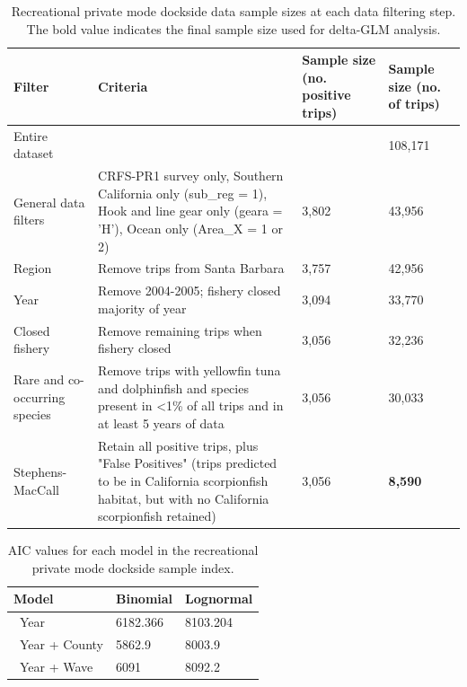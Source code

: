 \documentclass[12pt,]{article}
\begin{document}
\FloatBarrier

\begin{table}[ht]
\centering
\caption{Recreational private mode dockside data sample 
                                          sizes at each data filtering step.  
                                          The bold value indicates the final sample size 
                                          used for delta-GLM analysis.} 
\label{tab:Fleet4_RecPR_dockside_filter}
\begin{tabular}{>{\raggedright}p{1.5in}>{\raggedright}p{2.6in}>{\raggedright}p{1in}>{\raggedright}p{1in}}
  \hline
Filter & Criteria & Sample size (no. positive trips) & Sample size (no. of trips) \\ 
  \hline
Entire dataset &  &  & 108,171 \\ 
  General data filters & CRFS-PR1 survey only, Southern California only (sub\_reg = 1), Hook and line gear only (geara = 'H'), Ocean only (Area\_X = 1 or 2) & 3,802 & 43,956 \\ 
  Region & Remove trips from Santa Barbara & 3,757 & 42,956 \\ 
  Year & Remove 2004-2005; fishery closed majority of year & 3,094 & 33,770 \\ 
  Closed fishery & Remove remaining trips when fishery closed & 3,056 & 32,236 \\ 
  Rare and co-occurring species & Remove trips with yellowfin tuna and dolphinfish and species present in <1\% of all trips and in at least 5 years of data & 3,056 & 30,033 \\ 
  Stephens-MacCall & Retain all positive trips, plus "False Positives" (trips predicted to be in California scorpionfish habitat, but with no California scorpionfish retained) & 3,056 & \textbf{8,590} \\ 
   \hline
\end{tabular}
\end{table}\begin{table}[ht]
\centering
\caption{AIC values for each model in the
                                          recreational private mode dockside sample 
                                          index.} 
\label{tab:Fleet4_RecPR_dockside_aic}
\begin{tabular}{lll}
  \hline
Model & Binomial & Lognormal \\ 
  \hline
~Year & 6182.366 & 8103.204 \\ 
  ~Year + County & 5862.9 & 8003.9 \\ 
  ~Year + Wave & 6091 & 8092.2 \\ 

\end{tabular}
\end{table}
\end{document}
